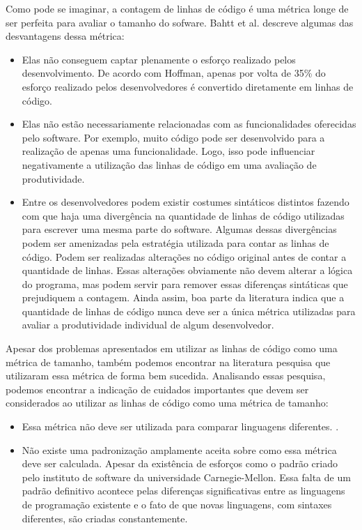 Como pode se imaginar, a contagem de linhas de código é uma métrica longe de ser perfeita para avaliar o tamanho do sofware. Bahtt et al. \cite{bhatt2012analysis} descreve algumas das desvantagens dessa métrica:

\begin{itemize}
\item Elas não conseguem captar plenamente o esforço realizado pelos desenvolvimento. De acordo com Hoffman\cite{hoffman2000darker}, apenas por volta de 35\% do esforço realizado pelos desenvolvedores é convertido diretamente em linhas de código.
\item Elas não estão necessariamente relacionadas com as funcionalidades oferecidas pelo software. Por exemplo, muito código pode ser desenvolvido para a realização de apenas uma funcionalidade. Logo, isso pode influenciar negativamente a utilização das linhas de código em uma avaliação de produtividade.
\item Entre os desenvolvedores podem existir costumes sintáticos distintos fazendo com que haja uma divergência na quantidade de linhas de código utilizadas para escrever uma mesma parte do software. Algumas dessas divergências podem ser amenizadas pela estratégia utilizada para contar as linhas de código. Podem ser realizadas alterações no código original antes de contar a quantidade de linhas. Essas alterações obviamente não devem alterar a lógica do programa, mas podem servir para remover essas diferenças sintáticas que prejudiquem a contagem. Ainda assim, boa parte da literatura indica que a quantidade de linhas de código nunca deve ser  a única métrica utilizadas para avaliar a produtividade individual de algum desenvolvedor.
\end{itemize}

Apesar dos problemas apresentados em utilizar as linhas de código como uma métrica de tamanho, também podemos encontrar na literatura pesquisa que utilizaram essa métrica de forma bem sucedida\cite{maccormack2003trade,funk2005application,sudhakar2012measuring,tan2009productivity}. Analisando essas pesquisa, podemos encontrar a indicação de cuidados importantes que devem ser considerados ao utilizar as linhas de código como uma métrica de tamanho:

\begin{itemize}
\item Essa métrica não deve ser utilizada para comparar linguagens diferentes. \cite{rosenberg1997some,park1992software}.
\item Não existe uma padronização amplamente aceita sobre como essa métrica deve ser calculada. Apesar da existência de esforços como o padrão criado pelo instituto de software da universidade Carnegie-Mellon\cite{park1992software}. Essa falta de um padrão definitivo acontece pelas diferenças significativas entre as linguagens de programação existente e o fato de que novas linguagens, com sintaxes diferentes, são criadas constantemente.
\end{itemize} 


